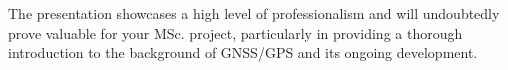 
The presentation showcases a high level of professionalism and will undoubtedly prove valuable for your MSc. project, particularly in providing a thorough introduction to the background of GNSS/GPS and its ongoing development.

